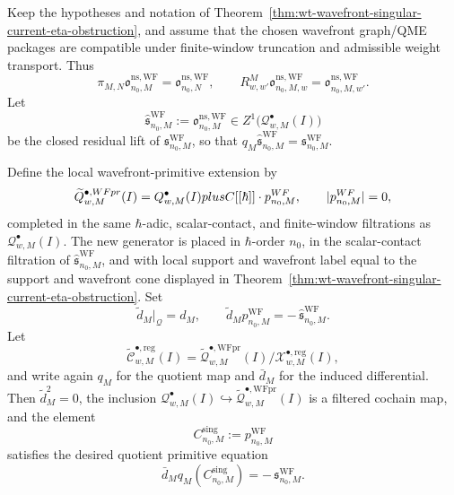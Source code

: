 \begin{thm}
\label{thm:wt-wavefront-distributional-primitive-cone}
  Keep the hypotheses and notation of
  Theorem~\ref{thm:wt-wavefront-singular-current-eta-obstruction}, and
  assume that the chosen wavefront graph/QME packages are compatible under
  finite-window truncation and admissible weight transport.  Thus
  \[
    \pi_{M,N}\mathfrak o^{\mathrm{ns,WF}}_{n_0,M}
      =
    \mathfrak o^{\mathrm{ns,WF}}_{n_0,N},
    \qquad
    R^M_{w,w'}\mathfrak o^{\mathrm{ns,WF}}_{n_0,M,w}
      =
    \mathfrak o^{\mathrm{ns,WF}}_{n_0,M,w'} .
  \]
  Let
  \[
    \widehat{\mathfrak s}^{\mathrm{WF}}_{n_0,M}
      :=
    \mathfrak o^{\mathrm{ns,WF}}_{n_0,M}
      \in Z^1\bigl(\mathcal Q^\bullet_{w,M}(I)\bigr)
  \]
  be the closed residual lift of
  \(\mathfrak s^{\mathrm{WF}}_{n_0,M}\), so that
  \(q_M\widehat{\mathfrak s}^{\mathrm{WF}}_{n_0,M}
  =\mathfrak s^{\mathrm{WF}}_{n_0,M}\).

  Define the local wavefront-primitive extension by
  \[
    \widetilde{Q}^{\bullet,WFpr}_{w,M}(I)
      =
    Q^\bullet_{w,M}(I)
      plus
    C[[\hbar]]\cdot p^{WF}_{n_0,M},
    \qquad |p^{WF}_{n_0,M}|=0,
  \]
  completed in the same \(\hbar\)-adic, scalar-contact, and
  finite-window filtrations as \(\mathcal Q^\bullet_{w,M}(I)\).  The new
  generator is placed in \(\hbar\)-order \(n_0\), in the scalar-contact
  filtration of \(\widehat{\mathfrak s}^{\mathrm{WF}}_{n_0,M}\), and with
  local support and wavefront label equal to the support and wavefront
  cone displayed in
  Theorem~\ref{thm:wt-wavefront-singular-current-eta-obstruction}.  Set
  \[
    \widetilde d_M|_{\mathcal Q}=d_M,\qquad
    \widetilde d_Mp^{\mathrm{WF}}_{n_0,M}
      =
    -\,\widehat{\mathfrak s}^{\mathrm{WF}}_{n_0,M}.
  \]
  Let
  \[
    \widetilde{\mathcal C}^{\bullet,\mathrm{reg}}_{w,M}(I)
      =
    \widetilde{\mathcal Q}^{\bullet,\mathrm{WFpr}}_{w,M}(I)/
    \mathcal X^{\bullet,\mathrm{reg}}_{w,M}(I),
  \]
  and write again \(q_M\) for the quotient map and
  \(\bar d_M\) for the induced differential.  Then
  \(\widetilde d_M^2=0\), the inclusion
  \(\mathcal Q^\bullet_{w,M}(I)\hookrightarrow
  \widetilde{\mathcal Q}^{\bullet,\mathrm{WFpr}}_{w,M}(I)\) is a
  filtered cochain map, and the element
  \[
    C^{\mathrm{sing}}_{n_0,M}:=p^{\mathrm{WF}}_{n_0,M}
  \]
  satisfies the desired quotient primitive equation
  \[
    \bar d_Mq_M(C^{\mathrm{sing}}_{n_0,M})
      =
    -\,\mathfrak s^{\mathrm{WF}}_{n_0,M}.
  \]


\end{thm}

